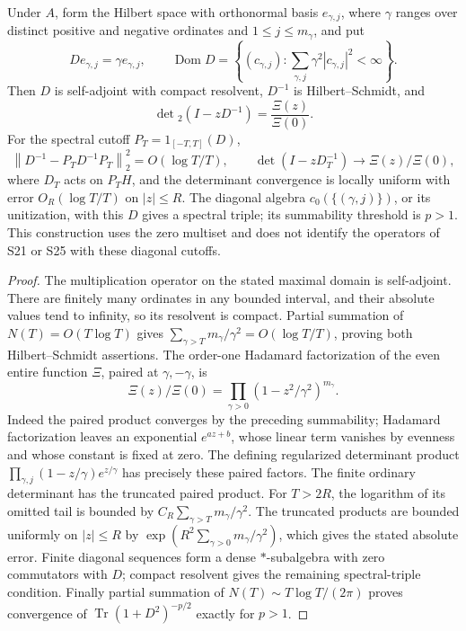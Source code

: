 \begin{theorem}
\label{AC-S08}
Under \(A\), form the Hilbert space with orthonormal basis
\(e_{\gamma,j}\), where \(\gamma\) ranges over distinct positive and
negative ordinates and \(1\leq j\leq m_\gamma\), and put
\[
 De_{\gamma,j}=\gamma e_{\gamma,j},\qquad
 \operatorname{Dom}D=
 \left\{(c_{\gamma,j}):\sum_{\gamma,j}\gamma^2|c_{\gamma,j}|^2<\infty\right\}.
\]
Then \(D\) is self-adjoint with compact resolvent,
\(D^{-1}\) is Hilbert--Schmidt, and
\[
 \det{}_2(I-zD^{-1})=\frac{\Xi(z)}{\Xi(0)}.
\]
For the spectral cutoff \(P_T=1_{[-T,T]}(D)\),
\[
 \left\|D^{-1}-P_TD^{-1}P_T\right\|_2^2
       =O(\log T/T),\qquad
 \det(I-zD_T^{-1})\longrightarrow\Xi(z)/\Xi(0),
\]
where \(D_T\) acts on \(P_TH\), and the determinant convergence is
locally uniform with error \(O_R(\log T/T)\) on \(|z|\leq R\).
The diagonal algebra \(c_0(\{(\gamma,j)\})\), or its unitization,
with this \(D\) gives a spectral triple; its summability threshold is
\(p>1\).  This construction uses the zero multiset and does not identify
the operators of S21 or S25 with these diagonal cutoffs.
\end{theorem}
\begin{proof}
The multiplication operator on the stated maximal domain is self-adjoint.
There are finitely many ordinates in any bounded interval, and their
absolute values tend to infinity, so its resolvent is compact.  Partial
summation of \(N(T)=O(T\log T)\) gives
\(\sum_{\gamma>T}m_\gamma/\gamma^2=O(\log T/T)\), proving both
Hilbert--Schmidt assertions.  The order-one Hadamard factorization of
the even entire function \(\Xi\), paired at \(\gamma,-\gamma\),
is
\[
 \Xi(z)/\Xi(0)=\prod_{\gamma>0}(1-z^2/\gamma^2)^{m_\gamma}.
\]
Indeed the paired product converges by the preceding summability;
Hadamard factorization leaves an exponential \(e^{az+b}\), whose
linear term vanishes by evenness and whose constant is fixed at zero.
The defining regularized determinant product
\(\prod_{\gamma,j}(1-z/\gamma)e^{z/\gamma}\) has precisely these
paired factors.  The finite ordinary determinant has the truncated
paired product.  For \(T>2R\), the logarithm of its omitted tail is
bounded by
\(C_R\sum_{\gamma>T}m_\gamma/\gamma^2\).
The truncated products are bounded uniformly on \(|z|\leq R\) by
\(\exp(R^2\sum_{\gamma>0}m_\gamma/\gamma^2)\), which gives the
stated absolute error.  Finite diagonal sequences form a dense
\(*\)-subalgebra with zero commutators with \(D\); compact resolvent
gives the remaining spectral-triple condition.  Finally partial
summation of \(N(T)\sim T\log T/(2\pi)\) proves convergence of
\(\operatorname{Tr}(1+D^2)^{-p/2}\) exactly for \(p>1\).
\end{proof}

